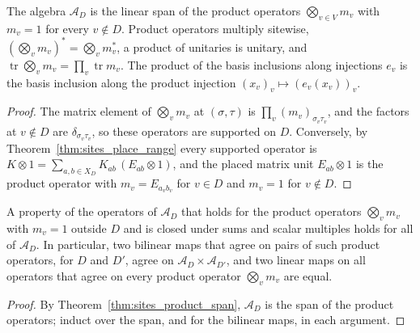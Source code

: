 \begin{theorem}
    \label{thm:sites_product_span}
    \leanok
    The algebra $\mathcal A_D$ is the linear span of the product operators
    $\bigotimes_{v\in V}m_v$ with $m_v=1$ for every $v\notin D$. Product operators
    multiply sitewise, $(\bigotimes_vm_v)^*=\bigotimes_vm_v^*$, a product of
    unitaries is unitary, and $\operatorname{tr}\bigotimes_vm_v=\prod_v\operatorname{tr}m_v$.
    The product of the basis inclusions along injections $e_v$ is the basis inclusion along the
    product injection $(x_v)_v\mapsto(e_v(x_v))_v$.
\end{theorem}
\begin{proof}\leanok
    The matrix element of $\bigotimes_vm_v$ at $(\sigma,\tau)$ is
    $\prod_v(m_v)_{\sigma_v\tau_v}$, and the factors at $v\notin D$ are
    $\delta_{\sigma_v\tau_v}$, so these operators are supported on $D$.
    Conversely, by Theorem~\ref{thm:sites_place_range} every supported operator
    is $K\otimes1=\sum_{a,b\in X_D}K_{ab}\,(E_{ab}\otimes1)$, and the placed
    matrix unit $E_{ab}\otimes1$ is the product operator with
    $m_v=E_{a_vb_v}$ for $v\in D$ and $m_v=1$ for $v\notin D$.
\end{proof}

\begin{corollary}
    \label{cor:sites_product_induction}
    \leanok
    A property of the operators of $\mathcal A_D$ that holds for the product
    operators $\bigotimes_vm_v$ with $m_v=1$ outside $D$ and is closed under sums and
    scalar multiples holds for all of $\mathcal A_D$. In particular, two bilinear maps
    that agree on pairs of such product operators, for $D$ and $D'$, agree on
    $\mathcal A_D\times\mathcal A_{D'}$, and two linear maps on all operators that
    agree on every product operator $\bigotimes_vm_v$ are equal.
\end{corollary}
\begin{proof}\leanok
    By Theorem~\ref{thm:sites_product_span}, $\mathcal A_D$ is the span of the product
    operators; induct over the span, and for the bilinear maps, in each argument.
\end{proof}


